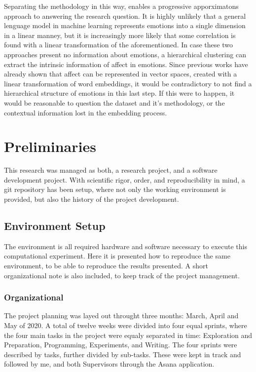 Separating the methodology in this way, enables a progressive apporximatons approach to answering the research question. It is highly unlikely that a general lenguage model in machine learning represents emotions into a single dimension in a linear manney, but it is increasingly more likely that some correlation is found with a linear transformation of the aforementioned. In case these two approaches present no information about emotions, a hierarchical clustering can extract the intrinsic information of affect in emotions. Since previous works have already shown that affect can be represented in vector spaces, created with a linear transformation of word embeddings\cite{TODO}, it would be contradictory to not find a hierarchical structure of emotions in this last step. If this were to happen, it would be reasonable to question the dataset and it's methodology, or the contextual information lost in the embedding process.

\section{Preliminaries}\label{sec:Preliminaries}
This research was managed as both, a research project, and a software development project.
With scientific rigor, order, and reproducibility in mind, a git repository has been setup, where not only the working environment is provided, but also the history of the project  development.

\subsection{Environment Setup}\label{sub:Environment Setup}
The environment is all required hardware and software necessary to execute this computational experiment. Here it is presented how to reproduce the same environment, to be able to reproduce the results presented. A short organizational note is also included, to keep track of the project management.

\subsubsection{Organizational}\label{subs:Organizational}
The project planning was layed out throught three months: March, April and May of 2020. A total of twelve weeks were divided into four equal sprints, where the four main tasks in the project were equaly separated in time: Exploration and Preparation, Programming, Experiments, and Writing. The four sprints were described by tasks, further divided by sub-tasks. These were kept in track and followed by me, and both Supervisors through the Asana application\cite{TODO}.

